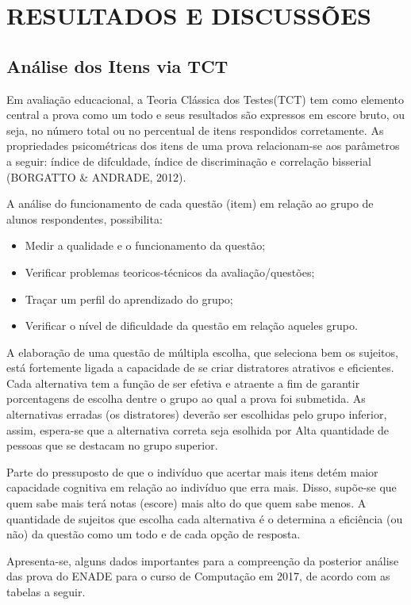 \documentclass[12pt]{article}
\begin{document}
\section{RESULTADOS E DISCUSSÕES}
\subsection{Análise dos Itens via TCT}

Em avaliação educacional, a Teoria Clássica dos Testes(TCT) tem como elemento central a prova como um todo e seus resultados são expressos em escore bruto, ou seja, no número total ou no percentual de itens respondidos corretamente. As propriedades psicométricas dos itens de uma prova relacionam-se aos parâmetros a seguir: índice de difculdade, índice de discriminação e correlação bisserial (BORGATTO \& ANDRADE, 2012).

A análise do funcionamento de cada questão (item) em relação ao grupo de alunos respondentes, possibilita: 

\begin{itemize}
    \item Medir a qualidade e o funcionamento da questão;
    \item Verificar problemas teoricos-técnicos da avaliação/questões; 
    \item Traçar um perfil do aprendizado do grupo;
    \item Verificar o nível de dificuldade da questão em relação aqueles grupo.
\end{itemize} 
 

A elaboração de uma questão de múltipla escolha, que seleciona bem os sujeitos, está fortemente ligada a capacidade de se criar distratores atrativos e eficientes. Cada alternativa tem a função de ser efetiva e atraente a fim de garantir porcentagens de escolha dentre o grupo ao qual a prova foi submetida. As alternativas erradas (os distratores) deverão ser escolhidas pelo grupo inferior, assim, espera-se que a alternativa correta seja esolhida por Alta quantidade de pessoas que se destacam no grupo superior.    

Parte do pressuposto de que o indivíduo que acertar mais itens detém maior capacidade cognitiva em relação ao indivíduo que erra mais. Disso, supõe-se que quem sabe mais terá notas (escore) mais alto do que quem sabe menos. A quantidade de sujeitos que escolha cada alternativa é o determina a eficiência (ou não) da questão como um todo e de cada opção de resposta.  

Apresenta-se, alguns dados importantes para a compreenção da posterior análise das prova do ENADE para o curso de Computação em 2017, de acordo com as tabelas a seguir.
\end{document}
